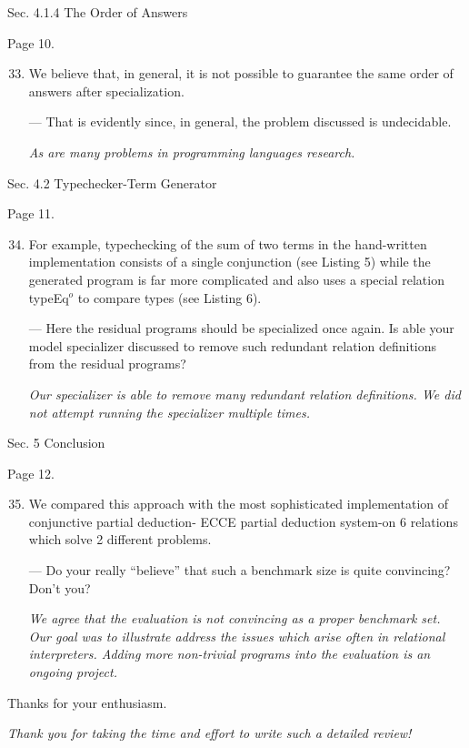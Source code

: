 Sec. 4.1.4 The Order of Answers

Page 10.

\begin{enumerate}
  \setcounter{enumi}{32}
  \item We believe that, in general, it is not possible to guarantee the same order of answers after specialization.

  --- That is evidently since, in general, the problem discussed is undecidable.

  \emph{As are many problems in programming languages research.}
\end{enumerate}

Sec. 4.2 Typechecker-Term Generator

Page 11.

\begin{enumerate}
  \setcounter{enumi}{33}
  \item For example, typechecking of the sum of two terms in the hand-written implementation consists of a single conjunction (see Listing 5) while the generated program is far more complicated and also uses a special relation typeEq$^o$ to compare types (see Listing 6).

  --- Here the residual programs should be specialized once again. Is able your model specializer discussed to remove such redundant relation definitions from the residual programs?

  \emph{Our specializer is able to remove many redundant relation definitions. We did not attempt running the specializer multiple times. }
\end{enumerate}

Sec. 5 Conclusion

Page 12.

\begin{enumerate}
  \setcounter{enumi}{34}
  \item We compared this approach with the most sophisticated implementation of conjunctive partial deduction- ECCE partial deduction system-on 6 relations which solve 2 different problems.

  --- Do your really ``believe'' that such a benchmark size is quite convincing? Don't you?

  \emph{We agree that the evaluation is not convincing as a proper benchmark set. Our goal was to illustrate address the issues which arise often in relational interpreters. Adding more non-trivial programs into the evaluation is an ongoing project.}
\end{enumerate}

Thanks for your enthusiasm.

\emph{Thank you for taking the time and effort to write such a detailed review!}
